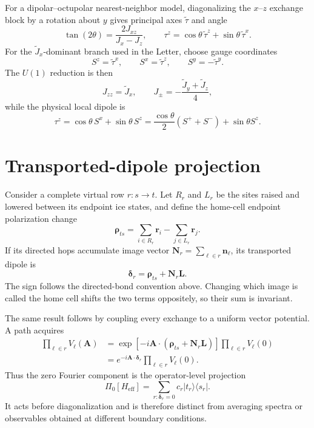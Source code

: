 \documentclass[aps,prl,onecolumn,amsmath,amssymb,superscriptaddress]{revtex4-2}
\newcommand{\Jzz}{J_{zz}}
\newcommand{\Jpm}{J_{\pm}}
\newcommand{\br}{\bm r}
\newcommand{\bdelta}{\bm\delta}
\begin{document}
For a dipolar--octupolar nearest-neighbor model, diagonalizing the $x$--$z$
exchange block by a rotation about $y$ gives principal axes
$\widetilde\tau$ and angle
\begin{equation}
 \tan(2\theta)=\frac{2J_{xz}}{J_x-J_z},\qquad
 \tau^z=\cos\theta\,\widetilde\tau^z+
        \sin\theta\,\widetilde\tau^x.
\label{eq:rotation}
\end{equation}
For the $\widetilde J_x$-dominant branch used in the Letter, choose gauge
coordinates
\begin{equation}
 S^z=\widetilde\tau^x,\qquad S^x=\widetilde\tau^z,
 \qquad S^y=-\widetilde\tau^y.
\end{equation}
The $U(1)$ reduction is then
\begin{equation}
 \Jzz=\widetilde J_x,\qquad
 \Jpm=-\frac{\widetilde J_y+\widetilde J_z}{4},
\label{eq:xyzmapSI}
\end{equation}
while the physical local dipole is
\begin{equation}
 \tau^z=\cos\theta\,S^x+\sin\theta\,S^z
 =\frac{\cos\theta}{2}(S^++S^-)+\sin\theta S^z.
\label{eq:mixedmoment}
\end{equation}

\section{Transported-dipole projection}
\label{sec:transport}

Consider a complete virtual row $r:s\to t$. Let $R_r$ and $L_r$ be the
sites raised and lowered between its endpoint ice states, and define the
home-cell endpoint polarization change
\begin{equation}
 \bm\rho_{ts}=\sum_{i\in R_r}\br_i-\sum_{j\in L_r}\br_j.
\end{equation}
If its directed hops accumulate image vector
$\bm N_r=\sum_{\ell\in r}\bm n_\ell$, its transported dipole is
\begin{equation}
 \bdelta_r=\bm\rho_{ts}+\bm N_r\bm L.
\label{eq:deltaSI}
\end{equation}
The sign follows the directed-bond convention above. Changing which image is
called the home cell shifts the two terms oppositely, so their sum is
invariant.

The same result follows by coupling every exchange to a uniform vector
potential. A path acquires
\begin{align}
 \prod_{\ell\in r}V_\ell(\bm A)
 &=\exp[-i\bm A\cdot(\bm\rho_{ts}+\bm N_r\bm L)]
   \prod_{\ell\in r}V_\ell(0)\\
 &=e^{-i\bm A\cdot\bdelta_r}\prod_{\ell\in r}V_\ell(0).
\end{align}
Thus the zero Fourier component is the operator-level projection
\begin{equation}
 \Pi_0[H_{\mathrm{eff}}]
 =\sum_{r:\bdelta_r=0}c_r|t_r\rangle\langle s_r|.
\label{eq:projector}
\end{equation}
It acts before diagonalization and is therefore distinct from averaging
spectra or observables obtained at different boundary conditions.
\end{document}
